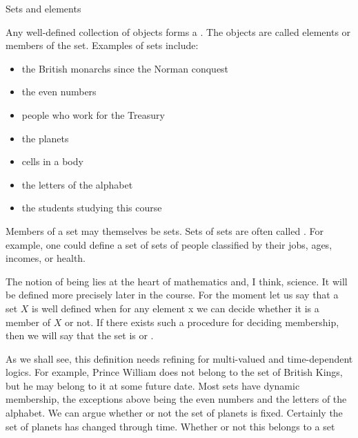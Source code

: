 \documentclass[a4paper]{cnx}
\begin{document}
\begin{cnxmodule}[id=m0001,name=Session 1: Set theory in the science of complex systems.]
\begin{ccontent}
\begin{csection}[id=sets-and-elements]{Sets and elements}
  \begin{cpara}
    Any well-defined collection of objects forms a {}. The objects are called
    elements or members of the set. Examples of sets include:
  \end{cpara}
  \begin{cexample}[id=sets-and-elements-ex]
    \begin{itemize}
    \item the British monarchs since the Norman conquest
    \item the even numbers
    \item people who work for the Treasury
    \item the planets
    \item cells in a body
    \item the letters of the alphabet
    \item the students studying this course
    \end{itemize}
  \end{cexample}
  \begin{cpara}
    Members of a set may themselves be sets. Sets of sets are often called
    {}. For example, one could define a set of sets of people classified by
    their jobs, ages, incomes, or health.
  \end{cpara}
  \begin{cpara}
    The notion of being {} lies at the heart of mathematics and, I
    think, science. It will be defined more precisely later in the course. For the moment
    let us say that a set $X$ is well defined when for any element x we can decide whether
    it is a member of $X$ or not. If there exists such a procedure for deciding
    membership, then we will say that the set is {} or {}.
  \end{cpara}
  \begin{cpara}
    As we shall see, this definition needs refining for multi-valued and time-dependent
    logics. For example, Prince William does not belong to the set of British Kings, but
    he may belong to it at some future date. Most sets have dynamic membership, the
    exceptions above being the even numbers and the letters of the alphabet. We can argue
    whether or not the set of planets is fixed. Certainly the set of {}
    planets has changed through time. Whether or not this belongs to a {} set

\end{cpara}
\end{csection}
\end{ccontent}
\end{cnxmodule}
\end{document}
